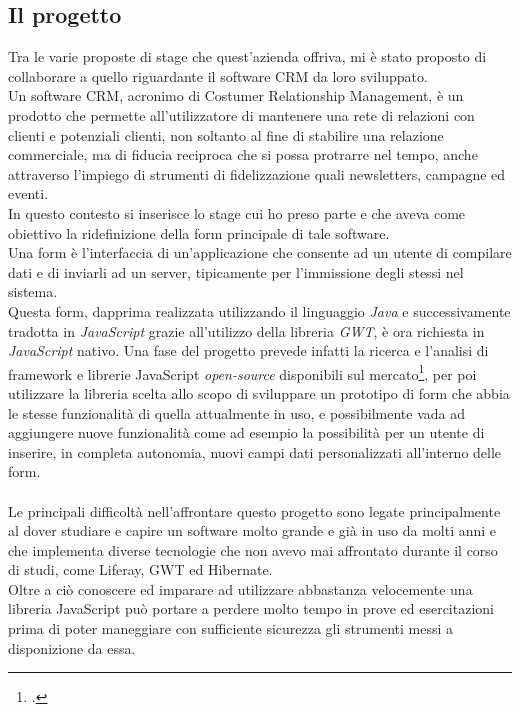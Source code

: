 \subsection{Il progetto}
Tra le varie proposte di stage che quest'azienda offriva, mi è stato proposto di collaborare a quello riguardante il software CRM da loro sviluppato.\\
Un software CRM, acronimo di Costumer Relationship Management, è un prodotto che permette all'utilizzatore di mantenere una rete di relazioni con clienti e potenziali clienti, non soltanto al fine di stabilire una relazione commerciale, ma di fiducia reciproca che si possa protrarre nel tempo, anche attraverso l'impiego di strumenti di fidelizzazione quali newsletters, campagne ed eventi. \\
In questo contesto si inserisce  lo stage cui ho preso parte e che aveva come obiettivo la ridefinizione della form principale di tale software.\\ Una form è l'interfaccia di un'applicazione che consente ad un utente di compilare dati e di inviarli ad un server, tipicamente per l'immissione degli stessi nel sistema.\\
Questa form, dapprima realizzata utilizzando il linguaggio \emph{Java} e successivamente tradotta in \emph{JavaScript} grazie all'utilizzo della libreria \emph{GWT}, è ora richiesta in \emph{JavaScript} nativo. Una fase del progetto prevede infatti la ricerca e l'analisi di framework e librerie JavaScript \emph{open-source} disponibili sul mercato\footcite{queste ed altre tecnologie verranno discusse nel dettaglio nei capitoli seguenti}, per poi utilizzare la libreria scelta allo scopo di sviluppare un prototipo di form che abbia le stesse funzionalità di quella attualmente in uso, e possibilmente vada ad aggiungere nuove funzionalità come ad esempio la possibilità per un utente di inserire, in completa autonomia, nuovi campi dati personalizzati all'interno delle form.\\
\\
Le principali difficoltà nell'affrontare questo progetto sono legate principalmente al dover studiare e capire un software molto grande e già in uso da molti anni e che implementa diverse tecnologie che non avevo mai affrontato durante il corso di studi, come Liferay, GWT ed Hibernate.\\
Oltre a ciò conoscere ed imparare ad utilizzare abbastanza velocemente una libreria JavaScript può portare a perdere molto tempo in prove ed esercitazioni prima di poter maneggiare con sufficiente sicurezza gli strumenti messi a disponizione da essa.\\ 
